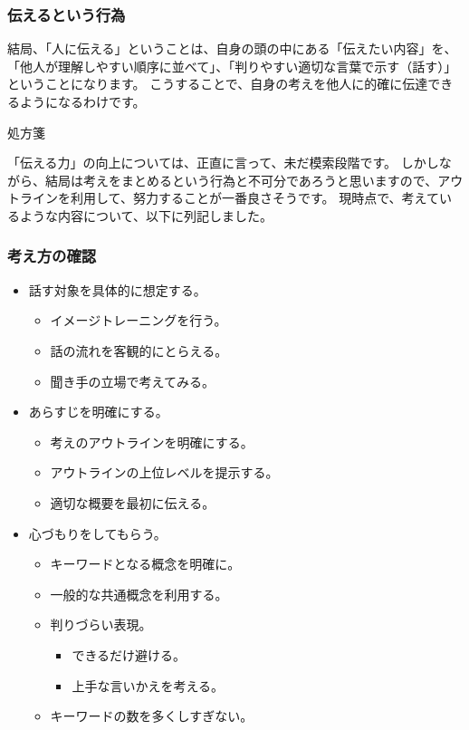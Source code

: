 \documentclass[12pt,a4paper]{jsarticle}
\makeatletter
\def\subsection{\@startsection 
{subsection}
{1}
{\z@}
{3.5ex plus -1ex minus -.2ex}
{1.ex plus .2ex}
{\large\bf}
}
\makeatother
\begin{document}
\subsubsection{伝えるという行為}

結局、「人に伝える」ということは、自身の頭の中にある「伝えたい内容」を、「他人が理解しやすい順序に並べて」、「判りやすい適切な言葉で示す（話す）」ということになります。
こうすることで、自身の考えを他人に的確に伝達できるようになるわけです。

\subsection{処方箋}

「伝える力」の向上については、正直に言って、未だ模索段階です。
しかしながら、結局は考えをまとめるという行為と不可分であろうと思いますので、アウトラインを利用して、努力することが一番良さそうです。
現時点で、考えているような内容について、以下に列記しました。

\subsubsection{考え方の確認}

\begin{itemize}
\item
話す対象を具体的に想定する。
	\begin{itemize}
	\item
	イメージトレーニングを行う。
	\item
	話の流れを客観的にとらえる。
	\item
	聞き手の立場で考えてみる。
	\end{itemize}
\item
あらすじを明確にする。
	\begin{itemize}
	\item
	考えのアウトラインを明確にする。
	\item
	アウトラインの上位レベルを提示する。
	\item
	適切な概要を最初に伝える。
	\end{itemize}
\item
心づもりをしてもらう。
	\begin{itemize}
	\item
	キーワードとなる概念を明確に。
	\item
	一般的な共通概念を利用する。
	\item
	判りづらい表現。
		\begin{itemize}
		\item
		できるだけ避ける。
		\item
		上手な言いかえを考える。
		\end{itemize}
	\item
	キーワードの数を多くしすぎない。
	\end{itemize}
\end{itemize}
\end{document}
